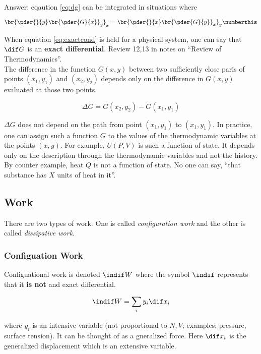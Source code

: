 \documentclass{article}
\begin{document}
Answer: eqaution \eqref{eq:dg} can be integrated in situations where

\[ \br{\pder{}{y}\br{\pder{G}{x}}_y}_x = \br{\pder{}{x}\br{\pder{G}{y}}_x}_y \numberthis \label{eq:exactcond}\]

When equation \eqref{eq:exactcond} is held for a physical system, one can say that $\dif G$ is an \textbf{exact differential}. Review 12,13 in notes on ``Review of Thermodynamics''. \\

The difference in the function $G(x,y)$ between two sufficiently close paris of points $(x_1, y_1)$ and $(x_2, y_2)$ depends only on the difference in $G(x,y)$ evaluated at those two points.

\[ \Delta G = G(x_2, y_2) - G(x_1, y_1) \]

$\Delta G$ does not depend on the path from point $(x_1, y_1)$ to $(x_1, y_1)$. In practice, one can assign such a function $G$ to the values of the thermodynamic variables at the points $(x,y)$. For example, $U(P,V)$ is such a function of state. It depends only on the description through the thermodynamic variables and not the history. \\

By counter example, heat $Q$ is not a function of state. No one can say, ``that substance has $X$ units of heat in it''.

\subsection{Work}

There are two types of work. One is called \textit{configuration work} and the other is called \textit{dissipative work}. \\

\subsubsection{Configuation Work}

Configuational work is denoted $\indif W$ where the symbol $\indif$ represents that it \textbf{is not} and exact differential.

\[ \indif W = \sum_i y_i \dif x_i \]

where $y_i$ is an intensive variable (not proportional to $N, V$; examples: pressure, surface tension). It can be thought of as a gneralized force. Here $\dif x_i$ is the generalized displacement which is an extensive variable.
\end{document}
